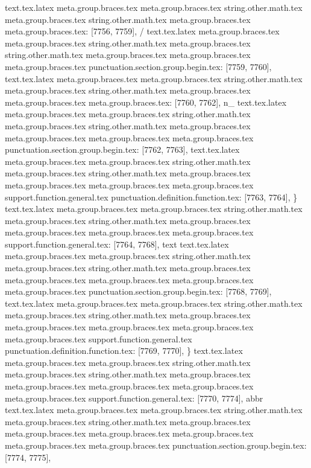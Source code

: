 {{{{{{{{{{{{{{{{{{{{{{{{{{{{{{{{{{{{{{{{{{{{{{{{{{{{{{{{{{{{{{{{{{{{{{{{{{{{{{{{{{{{{{{{{{{{{{{{{{{{{{{{{{{{{{{{{{{{{{{{{{{{{{{{{{{{{{{{{{{{{{{{{{{{{{{{{{{{{{{{{{{{{{{{{{{{{{{{{{{{{{{{{{{{{{{{{{{{{{{{{{{{{{{{{{{{{{{{{{{{{{{{{{{text.tex.latex meta.group.braces.tex meta.group.braces.tex string.other.math.tex meta.group.braces.tex string.other.math.tex meta.group.braces.tex meta.group.braces.tex: [7756, 7759], { / }
text.tex.latex meta.group.braces.tex meta.group.braces.tex string.other.math.tex meta.group.braces.tex string.other.math.tex meta.group.braces.tex meta.group.braces.tex meta.group.braces.tex punctuation.section.group.begin.tex: [7759, 7760], {{}
text.tex.latex meta.group.braces.tex meta.group.braces.tex string.other.math.tex meta.group.braces.tex string.other.math.tex meta.group.braces.tex meta.group.braces.tex meta.group.braces.tex: [7760, 7762], {n_}
text.tex.latex meta.group.braces.tex meta.group.braces.tex string.other.math.tex meta.group.braces.tex string.other.math.tex meta.group.braces.tex meta.group.braces.tex meta.group.braces.tex meta.group.braces.tex punctuation.section.group.begin.tex: [7762, 7763], {{}
text.tex.latex meta.group.braces.tex meta.group.braces.tex string.other.math.tex meta.group.braces.tex string.other.math.tex meta.group.braces.tex meta.group.braces.tex meta.group.braces.tex meta.group.braces.tex support.function.general.tex punctuation.definition.function.tex: [7763, 7764], {\}
text.tex.latex meta.group.braces.tex meta.group.braces.tex string.other.math.tex meta.group.braces.tex string.other.math.tex meta.group.braces.tex meta.group.braces.tex meta.group.braces.tex meta.group.braces.tex support.function.general.tex: [7764, 7768], {text}
text.tex.latex meta.group.braces.tex meta.group.braces.tex string.other.math.tex meta.group.braces.tex string.other.math.tex meta.group.braces.tex meta.group.braces.tex meta.group.braces.tex meta.group.braces.tex meta.group.braces.tex punctuation.section.group.begin.tex: [7768, 7769], {{}
text.tex.latex meta.group.braces.tex meta.group.braces.tex string.other.math.tex meta.group.braces.tex string.other.math.tex meta.group.braces.tex meta.group.braces.tex meta.group.braces.tex meta.group.braces.tex meta.group.braces.tex support.function.general.tex punctuation.definition.function.tex: [7769, 7770], {\}
text.tex.latex meta.group.braces.tex meta.group.braces.tex string.other.math.tex meta.group.braces.tex string.other.math.tex meta.group.braces.tex meta.group.braces.tex meta.group.braces.tex meta.group.braces.tex meta.group.braces.tex support.function.general.tex: [7770, 7774], {abbr}
text.tex.latex meta.group.braces.tex meta.group.braces.tex string.other.math.tex meta.group.braces.tex string.other.math.tex meta.group.braces.tex meta.group.braces.tex meta.group.braces.tex meta.group.braces.tex meta.group.braces.tex meta.group.braces.tex punctuation.section.group.begin.tex: [7774, 7775], {{}
}}}}}}}}}}}}}}}}}}}}}}}}}}}}}}}}}}}}}}}}}}}}}}}}}}}}}}}}}}}}}}}}}}}}}}}}}}}}}}}}}}}}}}}}}}}}}}}}}}}}}}}}}}}}}}}}}}}}}}}}}}}}}}}}}}}}}}}}}}}}}}}}}}}}}}}}}}}}}}}}}}}}}}}}}}}}}}}}}}}}}}}}}}}}}}}}}}}}}}}}}}}}}}}}}}}}}}}}}}}}}}}}}}}}}}}}}
